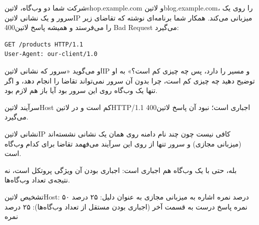 
شرکت شما دو وب‌گاه، ‌لاتین{shop.example.com} و ‌لاتین{blog.example.com}، را روی یک سرور و یک نشانی ‌لاتین{IP} میزبانی می‌کند.
همکار شما برنامه‌ای نوشته که تقاضای زیر را می‌فرستد و همیشه پاسخ ‌لاتین{400 Bad Request} می‌گیرد:

\begin{latin}
\begin{verbatim}
GET /products HTTP/1.1
User-Agent: our-client/1.0
\end{verbatim}
\end{latin}

او می‌گوید «سرور که نشانی ‌لاتین{IP} و مسیر را دارد، پس چه چیزی کم است؟»
به او توضیح دهید چه چیزی کم است، چرا بدون آن سرور نمی‌تواند تقاضا را انجام دهد، و اگر تنها یک وب‌گاه روی این سرور بود آیا باز هم لازم بود.


\begin{پاسخ}

سرآیند ‌لاتین{Host} کم است و در ‌لاتین{HTTP/1.1} اجباری است؛ نبود آن پاسخ ‌لاتین{400} می‌گیرد.

نشانی ‌لاتین{IP} کافی نیست چون چند نام دامنه روی همان یک نشانی نشسته‌اند (میزبانی مجازی) و سرور تنها از روی این سرآیند می‌فهمد تقاضا برای کدام وب‌گاه است.

بله، حتی با یک وب‌گاه هم اجباری است: اجباری بودن آن ویژگی پروتکل است، نه نتیجه‌ی تعداد وب‌گاه‌ها.

 تشخیص ‌لاتین{Host}: ۵۰ درصد نمره
 اشاره به میزبانی مجازی به عنوان دلیل: ۲۵ درصد نمره
 پاسخ درست به قسمت آخر (اجباری بودن مستقل از تعداد وب‌گاه‌ها): ۲۵ درصد نمره

\end{پاسخ}
